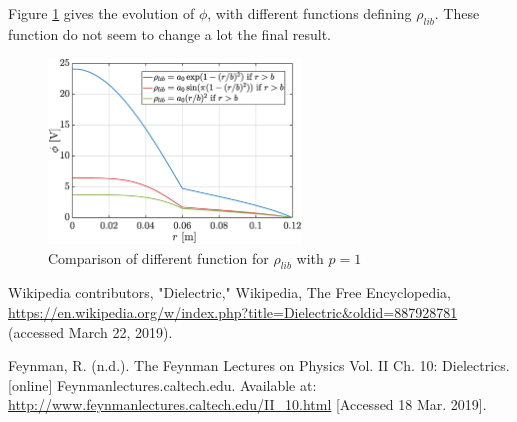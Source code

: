 \documentclass[a4paper,12pt,twoside]{article}
\begin{document}
      Figure \ref{fig:facrho} gives the evolution of $\phi$, with different functions defining $\rho_{lib}$.
      These function do not seem to change a lot the final result.

      \begin{figure}[h]
        \centering
        \includegraphics[width=0.6\textwidth]{graphs/facrho.eps}
        \caption{Comparison of different function for $\rho_{lib}$ with $p=1$}
        \label{fig:facrho}
      \end{figure}

  \newpage
  \begin{thebibliography}{99}
     Wikipedia contributors, "Dielectric," Wikipedia, The Free Encyclopedia, \url{https://en.wikipedia.org/w/index.php?title=Dielectric&oldid=887928781} (accessed March 22, 2019).

     Feynman, R. (n.d.). The Feynman Lectures on Physics Vol. II Ch. 10: Dielectrics. [online] Feynmanlectures.caltech.edu. Available at: \url{http://www.feynmanlectures.caltech.edu/II_10.html} [Accessed 18 Mar. 2019].
  \end{thebibliography}
\end{document}
